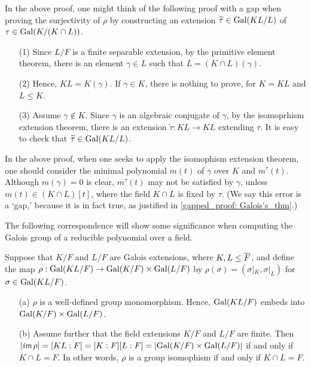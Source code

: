 \begin{rmk}
    In the above proof, one might think of the following proof with a gap when proving the surjectivity of $\rho$ by constructing an extension $\widetilde{\tau}\in{\textrm{Gal}({KL/L})}$ of $\tau\in{\textrm{Gal}({K/(K\cap L)})}$.
    
    \begin{enumerate}
        \item[(1)]
        {
            Since $L/F$ is a finite separable extension, by the primitive element theorem, there is an element $\gamma\in L$ such that $L=(K\cap L)(\gamma)$.
            }
        \item[(2)]
        {
            Hence, $KL=K(\gamma)$.
            If $\gamma\in K$, there is nothing to prove, for $K=KL$ and $L\leq K$.
        }
        \item[(3)]
        {
            Assume $\gamma\notin K$.
            \color{red}Since $\gamma$ is an algebraic conjugate of $\gamma$, by the isomoprhism extension theorem, there is an extension $\widetilde{\tau}: KL\rightarrow KL$ extending $\tau$. \color{black}
            It is easy to check that $\widetilde{\tau}\in{\textrm{Gal}({KL/L})}$.
        }
    \end{enumerate}
    In the above proof, when one seeks to apply the isomophism extension theorem, one should consider the minimal polynomial $m(t)$ of $\gamma$ over $K$ and $m^\tau(t)$.
    Although $m(\gamma)=0$ is clear, \color{red}$m^\tau(t)$ may not be satisfied by $\gamma$, unless $m(t)\in (K\cap L)[t]$\color{black}, where the field $K\cap L$ is fixed by $\tau$.
    (We say this error is a `gap,' because it is in fact true, as justified in \cref{gapped_proof: Galois's_thm}.)
\end{rmk}

The following correspondence will show some significance when computing the Galois group of a reducible polynomial over a field.
\begin{prop}
    Suppose that $K/F$ and $L/F$ are Galois extensions, where $K, L\leq\overline{F}$, and define the map $\rho: {\textrm{Gal}({KL/F})}\rightarrow{\textrm{Gal}({K/F})}\times{\textrm{Gal}({L/F})}$ by $\rho(\sigma)=(\sigma|_K, \sigma|_L)$ for $\sigma\in{\textrm{Gal}({KL/F})}$.
    \begin{enumerate}
        \item[(a)]
        {
            $\rho$ is a well-defined group monomorphism.    
            Hence, ${\textrm{Gal}({KL/F})}$ embeds into ${\textrm{Gal}({K/F})}\times{\textrm{Gal}({L/F})}$.
        }
        \item[(b)]
        {
            Assume further that the field extensions $K/F$ and $L/F$ are finite.
            Then $|\textit{im\,}\rho|=[KL:F]=[K:F][L:F]=|{\textrm{Gal}({K/F})}\times{\textrm{Gal}({L/F})}|$ if and only if $K\cap L=F$.
            In other words, $\rho$ is a group isomophism if and only if $K\cap L=F$.
        }
    \end{enumerate}
\end{prop}

